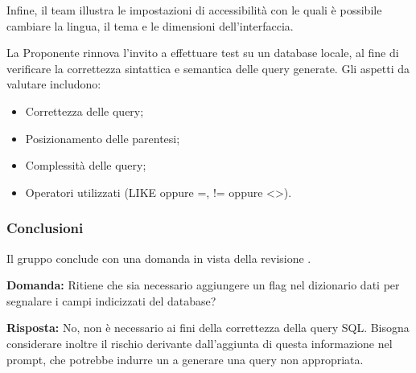 \vspace{0.5\baselineskip}
\par Infine, il team illustra le impostazioni di accessibilità con le quali è possibile cambiare la lingua, il tema e le dimensioni dell'interfaccia.

\par La Proponente rinnova l’invito a effettuare test su un database locale, al fine di verificare la correttezza sintattica e semantica delle query generate. Gli aspetti da valutare includono:
\begin{itemize}
	\item Correttezza delle query;
	\item Posizionamento delle parentesi;
	\item Complessità delle query;
	\item Operatori utilizzati (LIKE oppure =, != oppure <>).
\end{itemize}

\subsubsection{Conclusioni}
\par Il gruppo conclude con una domanda in vista della revisione .

\par \textbf{Domanda:} Ritiene che sia necessario aggiungere un flag nel dizionario dati per segnalare i campi indicizzati del database?
\par \textbf{Risposta:} No, non è necessario ai fini della correttezza della query SQL. Bisogna considerare inoltre il rischio derivante dall'aggiunta di questa informazione nel prompt, che potrebbe indurre un  a generare una query non appropriata.
